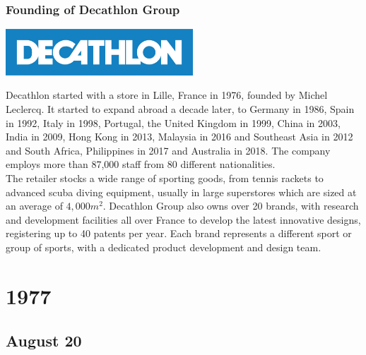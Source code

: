 \documentclass[11pt]{report}
\begin{document}
\subsection{Founding of Decathlon Group}
\vspace{2mm}\begin{center}\includegraphics[width=7cm]{./img/decathlonLogo.jpg}\end{center}
Decathlon started with a store in Lille, France in 1976, founded by Michel Leclercq. It started to expand abroad a decade later, to Germany in 1986, Spain in 1992, Italy in 1998, Portugal, the United Kingdom in 1999, China in 2003, India in 2009, Hong Kong in 2013, Malaysia in 2016 and Southeast Asia in 2012 and South Africa, Philippines in 2017 and Australia in 2018. The company employs more than 87,000 staff from 80 different nationalities.\\ \indent The retailer stocks a wide range of sporting goods, from tennis rackets to advanced scuba diving equipment, usually in large superstores which are sized at an average of $4,000m^{2}$. Decathlon Group also owns over 20 brands, with research and development facilities all over France to develop the latest innovative designs, registering up to 40 patents per year. Each brand represents a different sport or group of sports, with a dedicated product development and design team.

\chapter{1977}
\section{August 20}
\end{document}
